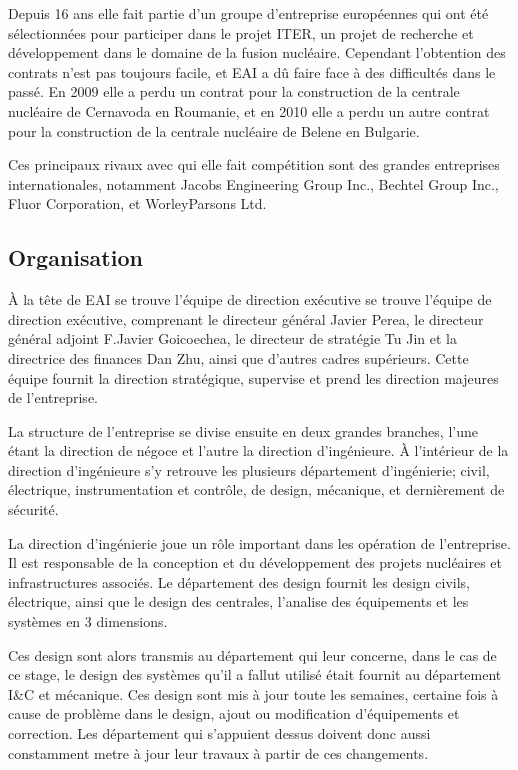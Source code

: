 \documentclass[11pt, openright]{book}
\begin{document}
Depuis 16 ans elle fait partie d'un groupe d'entreprise européennes qui ont été sélectionnées pour participer dans le projet ITER, un projet de recherche et développement dans le domaine de la fusion nucléaire. Cependant l'obtention des contrats n'est pas toujours facile, et EAI a dû faire face à des difficultés dans le passé. En 2009 elle a perdu un contrat pour la construction de la centrale nucléaire de Cernavoda en Roumanie, et en 2010 elle a perdu un autre contrat pour la construction de la centrale nucléaire de Belene en Bulgarie.

Ces principaux rivaux avec qui elle fait compétition sont des grandes entreprises internationales, notamment Jacobs Engineering Group Inc., Bechtel Group Inc., Fluor Corporation, et WorleyParsons Ltd.





\subsection{Organisation}

À la tête de EAI se trouve l'équipe de direction exécutive se trouve l'équipe de direction exécutive, comprenant le  directeur général Javier Perea,  le directeur général adjoint F.Javier Goicoechea, le directeur de stratégie Tu Jin et la directrice des finances Dan Zhu, ainsi que d'autres cadres supérieurs. Cette équipe fournit la direction stratégique, supervise et prend les direction majeures de l'entreprise.

La structure de l'entreprise se divise ensuite en deux grandes branches, l'une étant la direction de négoce et l'autre la direction d'ingénieure. À l'intérieur de la direction d'ingénieure s'y retrouve les plusieurs département d'ingénierie; civil, électrique, instrumentation et contrôle, de design, mécanique, et dernièrement de sécurité.

La direction d'ingénierie joue un rôle important dans les opération de l'entreprise. Il est responsable de la conception et du développement des projets nucléaires et infrastructures associés. Le département des design fournit les design civils, électrique, ainsi que le design des centrales, l'ana\-lise des équipements et les systèmes en 3 dimensions.

Ces design sont alors transmis au département qui leur concerne, dans le cas de ce stage, le design des systèmes qu'il a fallut utilisé était fournit au département I\&C et mécanique. Ces design sont mis à jour toute les semaines, certaine fois à cause de problème dans le design, ajout ou modification d'équipements et correction. Les département qui s'appuient dessus doivent donc aussi constamment metre à jour leur travaux à partir de ces changements.
\end{document}
